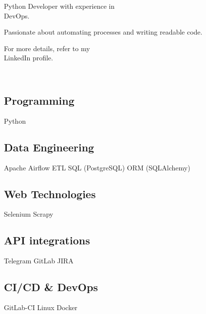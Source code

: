 \documentclass[a4paper]{MagicalCV}
\begin{document}
\lastupdated


\begin{minipage}[t]{0.33\textwidth} 


Python Developer with experience in \\DevOps.

Passionate about automating processes and writing readable code.

For more details, refer to my \\LinkedIn profile.
\sectionsep

\\



\sectionsep


\subsection{Programming}
Python

\subsection{Data Engineering}
Apache Airflow \textbullet{} 
ETL \textbullet{} 
SQL (PostgreSQL) \textbullet{} 
ORM (SQLAlchemy)

\subsection{Web Technologies}
Selenium \textbullet{} 
Scrapy

\subsection{API integrations}
Telegram \textbullet{} 
GitLab \textbullet{} 
JIRA

\subsection{CI/CD \& DevOps}
GitLab-CI \textbullet{} 
Linux \textbullet{} 
Docker
\sectionsep


\end{minipage}
\end{document}
